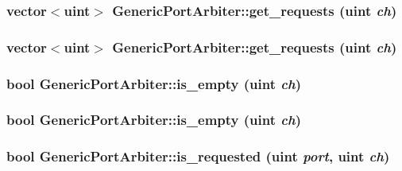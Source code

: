 \hypertarget{classGenericPortArbiter_cd5a78f1bf96701f5371bbcd601d9e53}{
\subsubsection[{get\_\-requests}]{\setlength{\rightskip}{0pt plus 5cm}vector$<${\bf uint}$>$ GenericPortArbiter::get\_\-requests ({\bf uint} {\em ch})}}
\label{classGenericPortArbiter_cd5a78f1bf96701f5371bbcd601d9e53}


\hypertarget{classGenericPortArbiter_cd5a78f1bf96701f5371bbcd601d9e53}{
\subsubsection[{get\_\-requests}]{\setlength{\rightskip}{0pt plus 5cm}vector$<${\bf uint}$>$ GenericPortArbiter::get\_\-requests ({\bf uint} {\em ch})}}
\label{classGenericPortArbiter_cd5a78f1bf96701f5371bbcd601d9e53}


\hypertarget{classGenericPortArbiter_a01546e85da0a6d1c1194fbf82f013bb}{
\subsubsection[{is\_\-empty}]{\setlength{\rightskip}{0pt plus 5cm}bool GenericPortArbiter::is\_\-empty ({\bf uint} {\em ch})}}
\label{classGenericPortArbiter_a01546e85da0a6d1c1194fbf82f013bb}


\hypertarget{classGenericPortArbiter_a01546e85da0a6d1c1194fbf82f013bb}{
\subsubsection[{is\_\-empty}]{\setlength{\rightskip}{0pt plus 5cm}bool GenericPortArbiter::is\_\-empty ({\bf uint} {\em ch})}}
\label{classGenericPortArbiter_a01546e85da0a6d1c1194fbf82f013bb}


\hypertarget{classGenericPortArbiter_b94c8e8e707e00e3265008691fd7c696}{
\subsubsection[{is\_\-requested}]{\setlength{\rightskip}{0pt plus 5cm}bool GenericPortArbiter::is\_\-requested ({\bf uint} {\em port}, \/  {\bf uint} {\em ch})}}
\label{classGenericPortArbiter_b94c8e8e707e00e3265008691fd7c696}


